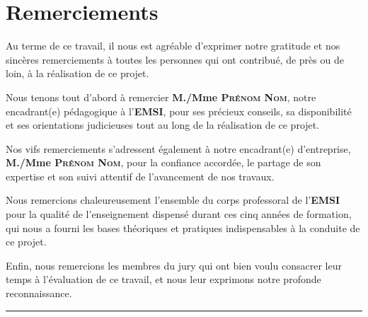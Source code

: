 \chapter*{Remerciements}
\thispagestyle{fancy}

Au terme de ce travail, il nous est agréable d'exprimer notre gratitude et nos sincères
remerciements à toutes les personnes qui ont contribué, de près ou de loin, à la réalisation de ce projet.

\vspace{0.5cm}

Nous tenons tout d'abord à remercier \textbf{M./Mme \textsc{Prénom Nom}}, notre encadrant(e) pédagogique
à l'\textbf{EMSI}, pour ses précieux conseils, sa disponibilité et ses orientations judicieuses
tout au long de la réalisation de ce projet.

\vspace{0.5cm}

Nos vifs remerciements s'adressent également à notre encadrant(e) d'entreprise,
\textbf{M./Mme \textsc{Prénom Nom}}, pour la confiance accordée, le partage de son expertise
et son suivi attentif de l'avancement de nos travaux.

\vspace{0.5cm}

Nous remercions chaleureusement l'ensemble du corps professoral de l'\textbf{EMSI} pour la
qualité de l'enseignement dispensé durant ces cinq années de formation, qui nous a fourni
les bases théoriques et pratiques indispensables à la conduite de ce projet.

\vspace{0.5cm}

Enfin, nous remercions les membres du jury qui ont bien voulu consacrer
leur temps à l'évaluation de ce travail, et nous leur exprimons notre profonde reconnaissance.

\vspace{1cm}
\begin{center}
  \textcolor{emsiRed}{\rule{0.4\linewidth}{0.8pt}}
\end{center}
